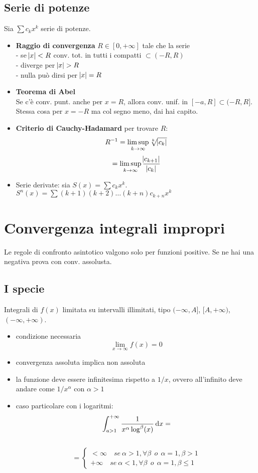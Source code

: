 \documentclass[a4paper,portrait,columns=3,5pt]{cheatsheet}
\begin{document}
\subsection{Serie di potenze}
Sia $\sum c_k x^k$ serie di potenze.
\begin{itemize}
    \item \textbf{Raggio di convergenza} $R \in [0, +\infty]$ tale che la serie \\- se $\abs{x} < R$ conv. tot. in tutti i compatti $\subset (-R, R)$\\- diverge per $\abs{x} > R$\\ - nulla può dirsi per $\abs{x} = R$
    \item \textbf{Teorema di Abel} \\Se c'è conv. punt. anche per $x = R$, allora conv. unif. in $[-a, R] \subset (-R, R]$. Stessa cosa per $x=-R$ ma col segno meno, dai hai capito.
    \item \textbf{Criterio di Cauchy-Hadamard} per trovare $R$: \\ $$R^{-1} = \limsup_{k\rightarrow \infty} \sqrt[k]{\abs{c_k}} $$ $$ = \limsup_{k \rightarrow \infty} \frac{\abs{c_{k+1}}}{\abs{c_k}}$$
    \item Serie derivate: sia $S(x) = \sum c_k x^k$. $S^n(x) = \sum (k+1)(k+2)\dots (k+n) c_{k+n} x^k$
\end{itemize}

\section{Convergenza integrali impropri}
Le regole di confronto asintotico valgono solo per funzioni positive. Se ne hai una negativa prova con conv. assolusta.
\subsection{I specie}
Integrali di $f(x)$ limitata su intervalli illimitati, tipo $(- \infty, A]$, $[A, + \infty)$, $(-\infty, + \infty)$.
\begin{itemize}
    \item condizione necessaria $$\lim_ {x \rightarrow \infty} f(x) = 0$$
    \item convergenza assoluta implica non assoluta
    \item la funzione deve essere infinitesima rispetto a $1/x$, ovvero  all'infinito deve andare come $1/x^{\alpha}$ con $\alpha > 1$
    \item caso particolare con i logaritmi: $$ \int_{a>1}^{+ \infty} \frac{1}{x^\alpha \log^\beta (x)} \dif x  =$$ \\$$ = 
    \begin{cases*}
        < \infty \quad se~\alpha > 1, \forall \beta ~~ o ~~ \alpha = 1, \beta > 1 \\
        + \infty \quad se~\alpha < 1, \forall \beta ~~ o ~~ \alpha = 1, \beta \leq 1
    \end{cases*}$$
\end{itemize}
\end{document}
